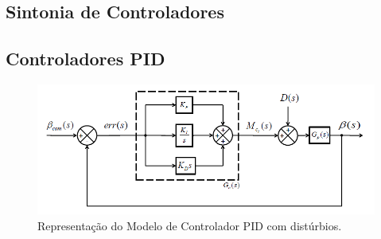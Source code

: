 
\subsection{Sintonia de Controladores}


\subsection{Controladores PID}

\begin{figure}[htb]
  \caption{Representação do Modelo de Controlador PID com distúrbios.}
  \begin{center}
      \includegraphics[scale=0.75]{img/pid_controller_Snider_p35}
  \end{center}
  \label{fig:pid_controller_Snider_p35}
\end{figure}




